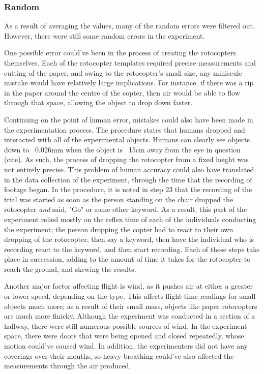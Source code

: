 \documentclass[]{article}
\theoremstyle{definition}
\begin{document}
\subsubsection{Random}
As a result of averaging the values, many of the random errors were filtered out. However, there were still some random errors in the experiment.

One possible error could've been in the process of creating the rotocopters themselves. Each of the rotocopter templates required precise measurements and cutting of the paper, and owing to the rotocopter's small size, any miniscule mistake would have relatively large implications. For instance, if there was a rip in the paper around the centre of the copter, then air would be able to flow through that space, allowing the object to drop down faster.

Continuing on the point of human error, mistakes could also have been made in the experimentation process. The procedure states that humans dropped and interacted with all of the experimental objects. Humans can clearly see objects down to ~0.026mm when the object is ~15cm away from the eye in question (cite). As such, the process of dropping the rotocopter from a fixed height was not entirely precise. This problem of human accuracy could also have translated in the data collection of the experiment, through the time that the recording of footage began. In the procedure, it is noted in step 23 that the recording of the trial was started as soon as the person standing on the chair dropped the rotocopter \textit{and} said, "Go" or some other keyword. As a result, this part of the experiment relied mostly on the reflex time of each of the individuals conducting the experiment; the person dropping the copter had to react to their own dropping of the rotocopter, then say a keyword, then have the individual who is recording react to the keyword, and then start recording. Each of these steps take place in succession, adding to the amount of time it takes for the rotocopter to reach the ground, and skewing the results.

Another major factor affecting flight is wind, as it pushes air at either a greater or lower speed, depending on the type. This affects flight time readings for small objects much more; as a result of their small mass, objects like paper rotocopters are much more finicky. Although the experiment was conducted in a section of a hallway, there were still numerous possible sources of wind. In the experiment space, there were doors that were being opened and closed repeatedly, whose motion could've caused wind. In addition, the experimenters did not have any coverings over their mouths, so heavy breathing could've also affected the measurements through the air produced.
\end{document}
